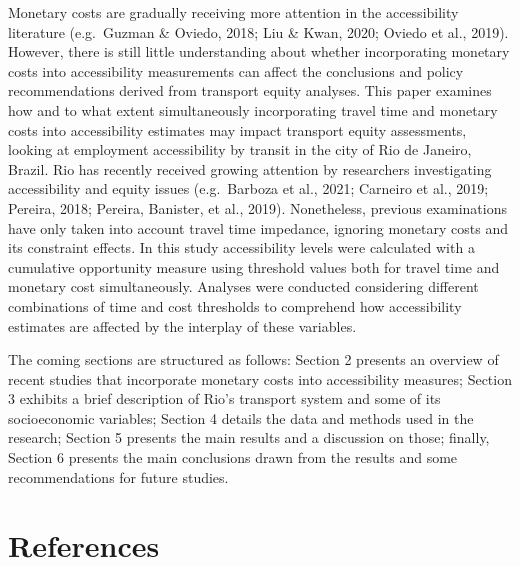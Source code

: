 \documentclass[msc,numbers]{coppe}
\begin{document}
  Monetary costs are gradually receiving more attention in the accessibility literature (e.g.~Guzman \& Oviedo, 2018; Liu \& Kwan, 2020; Oviedo et al., 2019). However, there is still little understanding about whether incorporating monetary costs into accessibility measurements can affect the conclusions and policy recommendations derived from transport equity analyses. This paper examines how and to what extent simultaneously incorporating travel time and monetary costs into accessibility estimates may impact transport equity assessments, looking at employment accessibility by transit in the city of Rio de Janeiro, Brazil. Rio has recently received growing attention by researchers investigating accessibility and equity issues (e.g.~Barboza et al., 2021; Carneiro et al., 2019; Pereira, 2018; Pereira, Banister, et al., 2019). Nonetheless, previous examinations have only taken into account travel time impedance, ignoring monetary costs and its constraint effects. In this study accessibility levels were calculated with a cumulative opportunity measure using threshold values both for travel time and monetary cost simultaneously. Analyses were conducted considering different combinations of time and cost thresholds to comprehend how accessibility estimates are affected by the interplay of these variables.

  The coming sections are structured as follows: Section 2 presents an overview of recent studies that incorporate monetary costs into accessibility measures; Section 3 exhibits a brief description of Rio's transport system and some of its socioeconomic variables; Section 4 details the data and methods used in the research; Section 5 presents the main results and a discussion on those; finally, Section 6 presents the main conclusions drawn from the results and some recommendations for future studies.

  \hypertarget{references}{%
  \chapter*{References}\label{references}}

  
  
\end{document}

